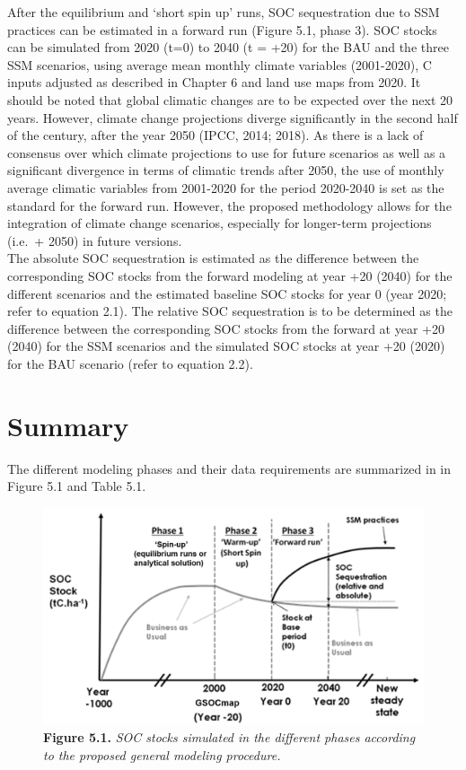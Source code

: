 \documentclass[
  10pt,
  b5paper,
]{book}
\begin{document}
After the equilibrium and `short spin up' runs, SOC sequestration due to SSM practices can be estimated in a forward run (Figure 5.1, phase 3). SOC stocks can be simulated from 2020 (t=0) to 2040 (t = +20) for the BAU and the three SSM scenarios, using average mean monthly climate variables (2001-2020), C inputs adjusted as described in Chapter 6 and land use maps from 2020.
It should be noted that global climatic changes are to be expected over the next 20 years. However, climate change projections diverge significantly in the second half of the century, after the year 2050 (IPCC, 2014; 2018). As there is a lack of consensus over which climate projections to use for future scenarios as well as a significant divergence in terms of climatic trends after 2050, the use of monthly average climatic variables from 2001-2020 for the period 2020-2040 is set as the standard for the forward run. However, the proposed methodology allows for the integration of climate change scenarios, especially for longer-term projections (i.e.~+ 2050) in future versions.\\
The absolute SOC sequestration is estimated as the difference between the corresponding SOC stocks from the forward modeling at year +20 (2040) for the different scenarios and the estimated baseline SOC stocks for year 0 (year 2020; refer to equation 2.1). The relative SOC sequestration is to be determined as the difference between the corresponding SOC stocks from the forward at year +20 (2040) for the SSM scenarios and the simulated SOC stocks at year +20 (2020) for the BAU scenario (refer to equation 2.2).

\hypertarget{summary}{%
\section{Summary}\label{summary}}

The different modeling phases and their data requirements are summarized in in Figure 5.1 and Table 5.1.

\begin{figure}
\centering
\includegraphics{images/Figure_5.1.png}
\caption{\textbf{Figure 5.1.} \emph{SOC stocks simulated in the different phases according to the proposed general modeling procedure.}}
\end{figure}
\end{document}

